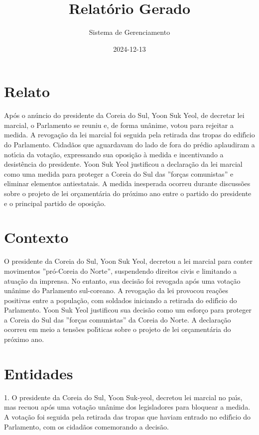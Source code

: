 \documentclass[article,11pt,oneside,a4paper,brazil,sumario=tradicional]{abntex2}%
\title{Relatório Gerado}%
\author{Sistema de Gerenciamento}%
\date{2024{-}12{-}13}%
\begin{document}
%
\normalsize%
\maketitle%
%
\frenchspacing%
\section{Relato}%
\label{sec:Relato}%
Ap\'os o an\'uncio do presidente da Coreia do Sul, Yoon Suk Yeol, de decretar lei marcial, o Parlamento se reuniu e, de forma un\^anime, votou para rejeitar a medida. A revoga\c{c}\~ao da lei marcial foi seguida pela retirada das tropas do edif{\'\i}cio do Parlamento. Cidad\~aos que aguardavam do lado de fora do pr\'edio aplaudiram a not{\'\i}cia da vota\c{c}\~ao, expressando sua oposi\c{c}\~ao \`a medida e incentivando a desist\^encia do presidente. Yoon Suk Yeol justificou a declara\c{c}\~ao da lei marcial como uma medida para proteger a Coreia do Sul das ''for\c{c}as comunistas'' e eliminar elementos antiestatais. A medida inesperada ocorreu durante discuss\~oes sobre o projeto de lei or\c{c}ament\'aria do pr\'oximo ano entre o partido do presidente e o principal partido de oposi\c{c}\~ao.

%
\section{Contexto}%
\label{sec:Contexto}%
O presidente da Coreia do Sul, Yoon Suk Yeol, decretou a lei marcial para conter movimentos ''pr\'o-Coreia do Norte'', suspendendo direitos civis e limitando a atua\c{c}\~ao da imprensa. No entanto, sua decis\~ao foi revogada ap\'os uma vota\c{c}\~ao un\^anime do Parlamento sul-coreano. A revoga\c{c}\~ao da lei provocou rea\c{c}\~oes positivas entre a popula\c{c}\~ao, com soldados iniciando a retirada do edif{\'\i}cio do Parlamento. Yoon Suk Yeol justificou sua decis\~ao como um esfor\c{c}o para proteger a Coreia do Sul das ''for\c{c}as comunistas'' da Coreia do Norte. A declara\c{c}\~ao ocorreu em meio a tens\~oes pol{\'\i}ticas sobre o projeto de lei or\c{c}ament\'aria do pr\'oximo ano.

%
\section{Entidades}%
\label{sec:Entidades}%
1. O presidente da Coreia do Sul, Yoon Suk-yeol, decretou lei marcial no pa{\'\i}s, mas recuou ap\'os uma vota\c{c}\~ao un\^anime dos legisladores para bloquear a medida. A vota\c{c}\~ao foi seguida pela retirada das tropas que haviam entrado no edif{\'\i}cio do Parlamento, com os cidad\~aos comemorando a decis\~ao.
\end{document}
